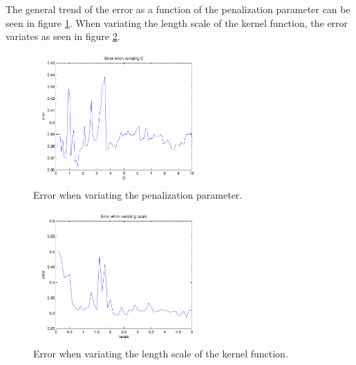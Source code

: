 The general trend of the error as a function of the penalization parameter can be seen in figure \ref{fig:q211.4}.
When variating the length scale of the kernel function, the error variates as seen in figure \ref{fig:q211.5}.

\begin{figure}[!htbp]
  \centering
  \includegraphics[width=0.6\textwidth]{./images/q211_errors.pdf}
  \caption{Error when variating the penalization parameter.}
  \label{fig:q211.4}
\end{figure}
\begin{figure}[!htbp]
  \centering
  \includegraphics[width=0.6\textwidth]{./images/q211_errors_lscale.pdf}
  \caption{Error when variating the length scale of the kernel function.}
  \label{fig:q211.5}
\end{figure}
